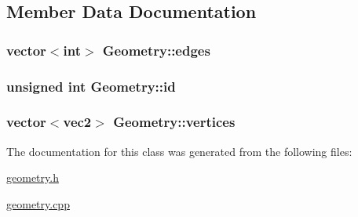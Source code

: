 \subsection{Member Data Documentation}
\hypertarget{class_geometry_a81016e7d24d062ea51dd6842ee576c17}{
\subsubsection[{edges}]{\setlength{\rightskip}{0pt plus 5cm}vector$<$int$>$ Geometry\+::edges}}\label{class_geometry_a81016e7d24d062ea51dd6842ee576c17}
\hypertarget{class_geometry_aad8da7cd260eff56d34895126f04b75d}{
\subsubsection[{id}]{\setlength{\rightskip}{0pt plus 5cm}unsigned int Geometry\+::id}}\label{class_geometry_aad8da7cd260eff56d34895126f04b75d}
\hypertarget{class_geometry_a30086a92b88740f2ca9253f708a6639a}{
\subsubsection[{vertices}]{\setlength{\rightskip}{0pt plus 5cm}vector$<$vec2$>$ Geometry\+::vertices}}\label{class_geometry_a30086a92b88740f2ca9253f708a6639a}


The documentation for this class was generated from the following files\+:\begin{DoxyCompactItemize}
\item 
\hyperlink{geometry_8h}{geometry.\+h}\item 
\hyperlink{geometry_8cpp}{geometry.\+cpp}\end{DoxyCompactItemize}
